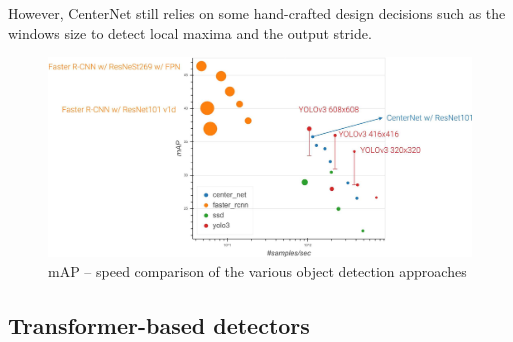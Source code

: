 \begin{description}
\begin{remark}
        However, CenterNet still relies on some hand-crafted design decisions such as the windows size to detect local maxima and the output stride.
    \end{remark}
\end{description}

\begin{figure}[H]
    \centering
    \includegraphics[width=0.75\linewidth]{./img/_object_detection_map_speed_plot.jpg}
    \caption{
        mAP -- speed comparison of the various object detection approaches
    }
\end{figure}


\subsection{Transformer-based detectors}

